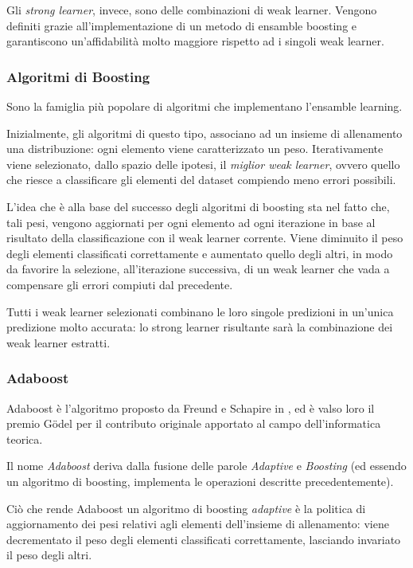                 Gli \emph{strong learner}, invece, sono delle combinazioni di weak learner.
                Vengono definiti grazie all'implementazione di un metodo di ensamble boosting e garantiscono un'affidabilità molto maggiore rispetto ad i singoli weak learner.

            \subsubsection{Algoritmi di Boosting}
            \label{subsub:boostin_alg}
                Sono la famiglia più popolare di algoritmi che implementano l'ensamble learning.

                Inizialmente, gli algoritmi di questo tipo, associano ad un insieme di allenamento una distribuzione: ogni elemento viene caratterizzato un peso.
                Iterativamente viene selezionato, dallo spazio delle ipotesi, il \emph{miglior weak learner}, ovvero quello che riesce a classificare gli elementi del dataset compiendo meno errori possibili.

                L'idea che è alla base del successo degli algoritmi di boosting sta nel fatto che, tali pesi, vengono aggiornati per ogni elemento ad ogni iterazione in base al risultato della classificazione con il weak learner corrente. 
                Viene diminuito il peso degli elementi classificati correttamente e aumentato quello degli altri, in modo da favorire la selezione, all'iterazione successiva, di un weak learner che vada a compensare gli errori compiuti dal precedente.

                Tutti i weak learner selezionati combinano le loro singole predizioni in un'unica predizione molto accurata: lo strong learner risultante sarà la combinazione dei weak learner estratti.

            \subsubsection{Adaboost}
                Adaboost è l'algoritmo proposto da Freund e Schapire in \cite{Freund97}, ed è valso loro il premio Gödel per il contributo originale apportato al campo dell'informatica teorica.

                Il nome \emph{Adaboost} deriva dalla fusione delle parole \emph{Adaptive} e \emph{Boosting} (ed essendo un algoritmo di boosting, implementa le operazioni descritte precedentemente).

                Ciò che rende Adaboost un algoritmo di boosting \emph{adaptive} è la politica di aggiornamento dei pesi relativi agli elementi dell'insieme di allenamento: viene decrementato il peso degli elementi classificati correttamente, lasciando invariato il peso degli altri.

